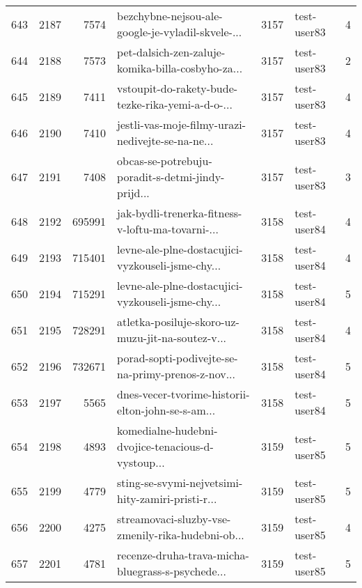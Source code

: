 \begin{tabular}{lrrlrlr}
643  &       2187 &     7574 &  bezchybne-nejsou-ale-google-je-vyladil-skvele-... &     3157 &                  test-user83 &               4 \\
644  &       2188 &     7573 &  pet-dalsich-zen-zaluje-komika-billa-cosbyho-za... &     3157 &                  test-user83 &               2 \\
645  &       2189 &     7411 &  vstoupit-do-rakety-bude-tezke-rika-yemi-a-d-o-... &     3157 &                  test-user83 &               4 \\
646  &       2190 &     7410 &  jestli-vas-moje-filmy-urazi-nedivejte-se-na-ne... &     3157 &                  test-user83 &               4 \\
647  &       2191 &     7408 &  obcas-se-potrebuju-poradit-s-detmi-jindy-prijd... &     3157 &                  test-user83 &               3 \\
648  &       2192 &   695991 &  jak-bydli-trenerka-fitness-v-loftu-ma-tovarni-... &     3158 &                  test-user84 &               4 \\
649  &       2193 &   715401 &  levne-ale-plne-dostacujici-vyzkouseli-jsme-chy... &     3158 &                  test-user84 &               4 \\
650  &       2194 &   715291 &  levne-ale-plne-dostacujici-vyzkouseli-jsme-chy... &     3158 &                  test-user84 &               5 \\
651  &       2195 &   728291 &  atletka-posiluje-skoro-uz-muzu-jit-na-soutez-v... &     3158 &                  test-user84 &               4 \\
652  &       2196 &   732671 &  porad-sopti-podivejte-se-na-primy-prenos-z-nov... &     3158 &                  test-user84 &               5 \\
653  &       2197 &     5565 &  dnes-vecer-tvorime-historii-elton-john-se-s-am... &     3158 &                  test-user84 &               5 \\
654  &       2198 &     4893 &  komedialne-hudebni-dvojice-tenacious-d-vystoup... &     3159 &                  test-user85 &               5 \\
655  &       2199 &     4779 &  sting-se-svymi-nejvetsimi-hity-zamiri-pristi-r... &     3159 &                  test-user85 &               5 \\
656  &       2200 &     4275 &  streamovaci-sluzby-vse-zmenily-rika-hudebni-ob... &     3159 &                  test-user85 &               4 \\
657  &       2201 &     4781 &  recenze-druha-trava-micha-bluegrass-s-psychede... &     3159 &                  test-user85 &               5 \\

\end{tabular}
